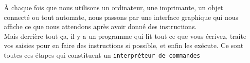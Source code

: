 \thispagestyle{plain}			%
\setlength{\parskip}{0pt plus 1.0pt}




















À chaque fois que nous utilisons un ordinateur, une imprimante, un objet connecté ou tout automate, nous passons par une interface graphique qui nous affiche ce que nous attendons après avoir donné des instructions.\\
Mais derrière tout ça, il y a un programme qui lit tout ce que vous écrivez, traite vos saisies pour en faire des instructions si possible, et enfin les exécute. Ce sont toutes ces étapes qui constituent un \texttt{interpréteur de commandes}

